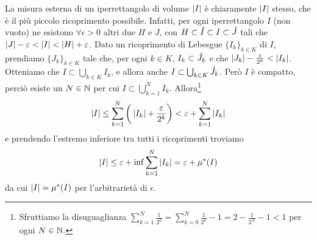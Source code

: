 La misura esterna di un iperrettangolo di volume $\left|{I}\right|$ è chiaramente $\left|{I}\right|$ stesso, che è il più piccolo ricoprimento possibile.
Infatti, per ogni iperrettangolo $I$ (non vuoto) ne esistono $\forall\epsilon>0$ altri due $H$ e $J$, con $H\subset\mathring{I}\subset I\subset\mathring{J}$ tali che $\left|{J}\right|-\varepsilon<\left|{I}\right|<\left|{H}\right|+\varepsilon$.
Dato un ricoprimento di Lebesgue $\{I_k\}_{k\in K}$ di $I$, prendiamo $\{J_k\}_{k\in K}$ tale che, per ogni $k\in K$, $I_k\subset\mathring{J_k}$ e che $\left|{J_k}\right|-\frac{\varepsilon}{2^k}<\left|{I_k}\right|$.
Otteniamo che $I\subset\bigcup_{k\in K} I_k$, e allora anche $I\subset\bigcup_{k\in K}\mathring{J_k}$.
Però $I$ è compatto, perciò esiste un $N\in\mathbb{N}$ per cui $I\subset\bigcup_{k=1}^NI_k$.
Allora\footnote{Sfruttiamo la disuguaglianza $\sum_{k=1}^N\frac1{2^k}=\sum_{k=0}^N\frac1{2^k}-1=2-\frac1{2^N}-1<1$ per ogni $N\in\mathbb{N}$.}
\begin{equation}
	\left|{I}\right|\leq\sum_{k=1}^N\bigg(\left|{I_k}\right|+\frac{\varepsilon}{2^k}\bigg)<\varepsilon+\sum_{k=1}^N\left|{I_k}\right|
\end{equation}
e prendendo l'estremo inferiore tra tutti i ricoprimenti troviamo
\begin{equation}
	\left|{I}\right|\leq\varepsilon+\inf\sum_{k=1}^N\left|{I_k}\right|=\varepsilon+\mu^*(I)
\end{equation}
da cui $\left|{I}\right|=\mu^*(I)$ per l'arbitrarietà di $\epsilon$.


